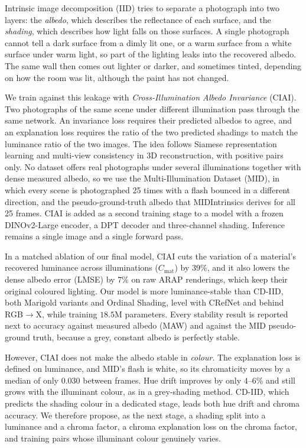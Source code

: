 Intrinsic image decomposition (IID) tries to separate a photograph into two layers:
the \emph{albedo}, which describes the reflectance of each surface, and the \emph{shading},
which describes how light falls on those surfaces.
A single photograph cannot tell a dark surface from a dimly lit one, or a warm surface
from a white surface under warm light, so part of the lighting leaks into the recovered
albedo. The same wall then comes out lighter or darker, and sometimes tinted, depending on
how the room was lit, although the paint has not changed.

We train against this leakage with \emph{Cross-Illumination Albedo Invariance} (CIAI).
Two photographs of the same scene under different illumination pass through the same
network. An invariance loss requires their predicted albedos to agree, and an explanation
loss requires the ratio of the two predicted shadings to match the luminance ratio of the
two images. The idea follows Siamese representation learning and multi-view consistency in
3D reconstruction, with positive pairs only. No dataset offers real photographs under
several illuminations together with dense measured albedo, so we use the Multi-Illumination
Dataset (MID), in which every scene is photographed 25 times with a flash bounced in a
different direction, and the pseudo-ground-truth albedo that MIDIntrinsics derives for all
25 frames. CIAI is added as a second training stage to a model with a frozen DINOv2-Large
encoder, a DPT decoder and three-channel shading. Inference remains a single image and a
single forward pass.

In a matched ablation of our final model, CIAI cuts the variation of a material's recovered
luminance across illuminations ($C_{\text{mat}}$) by $39\%$, and it also lowers the dense
albedo error (LMSE) by $7\%$ on raw ARAP renderings, which keep their original coloured
lighting. Our
model is more luminance-stable than CD-IID, both Marigold variants and Ordinal Shading, level
with CRefNet and behind RGB$\rightarrow$X, while training $18.5$M parameters. Every stability
result is reported next to accuracy against measured albedo (MAW) and against the MID
pseudo-ground truth, because a grey, constant albedo is perfectly stable.

However, CIAI does not make the albedo stable in \emph{colour}. The explanation loss is
defined on luminance, and MID's flash is white, so its chromaticity moves by a median of
only $0.030$ between frames. Hue drift improves by only $4$--$6\%$ and still grows with the
illuminant colour, as in a grey-shading method. CD-IID, which predicts the shading colour in
a dedicated stage, leads both hue drift and chroma accuracy. We therefore propose, as the
next stage, a shading split into a luminance and a chroma factor, a chroma explanation loss
on the chroma factor, and training pairs whose illuminant colour genuinely varies.
